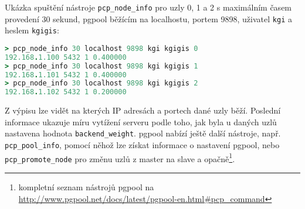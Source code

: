 Ukázka spuštění nástroje \texttt{pcp\_node\_info} pro uzly 0, 1 a 2 s maximálním
časem provedení 30 sekund, pgpool běžícím na localhostu, portem 9898, uživatel
\texttt{kgi} a heslem \texttt{kgigis}:
\begin{lstlisting}[language=ruby,morekeywords={pcp_node_info}]
> pcp_node_info 30 localhost 9898 kgi kgigis 0
192.168.1.100 5432 1 0.400000
> pcp_node_info 30 localhost 9898 kgi kgigis 1
192.168.1.101 5432 1 0.400000
> pcp_node_info 30 localhost 9898 kgi kgigis 2
192.168.1.102 5432 1 0.200000
\end{lstlisting}

Z výpisu lze vidět na kterých IP adresách a portech dané uzly běží. Poslední
informace ukazuje míru vytížení serveru podle toho, jak byla u daných uzlů
nastavena hodnota \texttt{backend\_weight}. pgpool nabízí ještě další nástroje,
např. \texttt{pcp\_pool\_info}, pomocí něhož lze získat informace o nastavení
pgpool, nebo \texttt{pcp\_promote\_node} pro změnu uzlů z master na slave a
opačně\footnote{kompletní seznam nástrojů pgpool na
\url{http://www.pgpool.net/docs/latest/pgpool-en.html\#pcp\_command}}.
